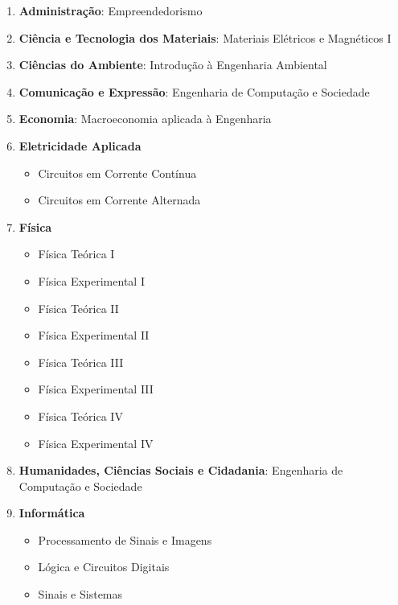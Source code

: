 \begin{enumerate}

    \item \textbf{Administração}: Empreendedorismo

    \item \textbf{Ciência e Tecnologia dos Materiais}: Materiais Elétricos e Magnéticos I

    \item \textbf{Ciências do Ambiente}: Introdução à Engenharia Ambiental

    \item \textbf{Comunicação e Expressão}: Engenharia de Computação e Sociedade

    \item \textbf{Economia}: Macroeconomia aplicada à Engenharia

    \item \textbf{Eletricidade Aplicada}  
    \begin{itemize}
        \item Circuitos em Corrente Contínua
        \item Circuitos em Corrente Alternada
    \end{itemize}

    \item \textbf{Física}  
    \begin{itemize}
        \item Física Teórica I
        \item Física Experimental I
        \item Física Teórica II
        \item Física Experimental II
        \item Física Teórica III
        \item Física Experimental III
        \item Física Teórica IV
        \item Física Experimental IV
    \end{itemize}

    \item \textbf{Humanidades, Ciências Sociais e Cidadania}: Engenharia de Computação e Sociedade

    \item \textbf{Informática}  
    \begin{itemize}
        \item Processamento de Sinais e Imagens
        \item Lógica e Circuitos Digitais
        \item Sinais e Sistemas
    \end{itemize}


\end{enumerate}
